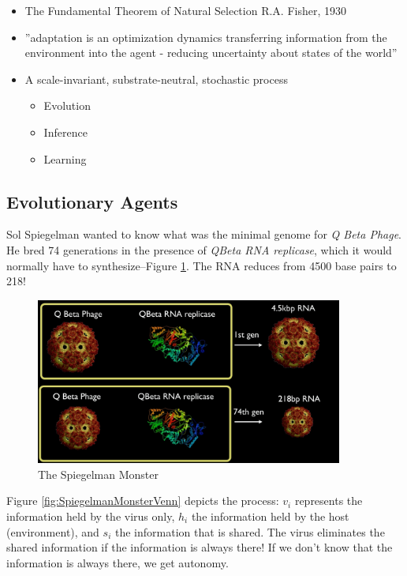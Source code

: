 \documentclass[]{article}
\begin{document}
\begin{itemize}
	\item The Fundamental Theorem of Natural Selection
	R.A. Fisher, 1930
	\item ''adaptation is an optimization dynamics
	transferring information
	from the environment into the agent
	- reducing uncertainty about states of the world''\cite{rockmore2018cultural}
	\item A scale-invariant, substrate-neutral, stochastic process
	\begin{itemize}
		\item Evolution
		\item Inference
		\item Learning
	\end{itemize}
\end{itemize}

\subsection{Evolutionary Agents}

Sol Spiegelman wanted to know what was the minimal genome for \textit{Q Beta Phage}. He bred 74 generations in the presence of \textit{QBeta RNA replicase}, which it would normally have to synthesize--Figure \ref{fig:SpiegelmanMonster}. The RNA reduces from 4500 base pairs to 218!\cite{spiegelman1965synthesis}
\begin{figure}[H]
	\caption{The Spiegelman Monster}\label{fig:SpiegelmanMonster}
	\includegraphics[width=0.9\textwidth]{SpiegelmanMonster}
\end{figure}

Figure \ref{fig:SpiegelmanMonsterVenn} depicts the process: $v_i$ represents the information held by the virus only, $h_i$ the information held by the host (environment), and $s_i$ the information that is shared. The virus eliminates the shared information if the information is always there! If we don't know that the information is always there, we get autonomy.
\end{document}
